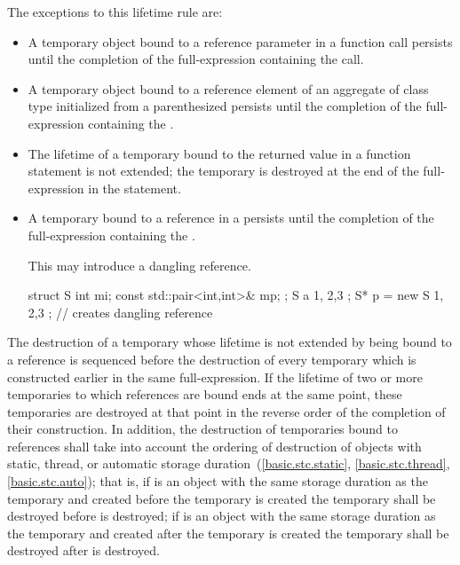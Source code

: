 The exceptions to this lifetime rule are:
\begin{itemize}
\item A temporary object bound to a reference parameter in a function call
persists until the completion of the full-expression containing the call.

\item A temporary object bound to a reference element of
an aggregate of class type initialized from
a parenthesized 
persists until the completion of the full-expression
containing the .

\item The lifetime of a temporary bound to the returned value in a function  statement is not extended; the temporary is destroyed at the end of the full-expression in the  statement.

\item A temporary bound to a reference in a  persists until the completion of the full-expression containing the .
\begin{note} This may introduce a dangling reference. \end{note}
\begin{example}
\begin{codeblock}
struct S { int mi; const std::pair<int,int>& mp; };
S a { 1, {2,3} };
S* p = new S{ 1, {2,3} };      // creates dangling reference
\end{codeblock}
\end{example}
\end{itemize}

\pnum
The destruction of a temporary whose lifetime is not extended by being
bound to a reference is sequenced before the destruction of every
temporary which is constructed earlier in the same full-expression.
If the lifetime of two or more temporaries to which references are bound ends
at the same point,
these temporaries are destroyed at that point in the reverse order of the
completion of their construction.
In addition, the destruction of temporaries bound to references shall
take into account the ordering of destruction of objects with static, thread, or
automatic storage duration~(\ref{basic.stc.static}, \ref{basic.stc.thread}, \ref{basic.stc.auto});
that is, if
is an object with the same storage duration as the temporary and
created before the temporary is created
the temporary shall be destroyed before
is destroyed;
if
is an object with the same storage duration as the temporary and
created after the temporary is created
the temporary shall be destroyed after
is destroyed.

